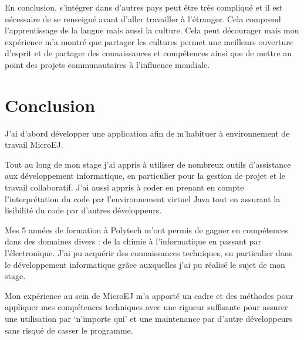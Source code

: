 \documentclass[french,a4paper,12pt]{report}
\begin{document}
En conclusion, s’intégrer dans d'autres pays peut être très compliqué et il est nécessaire de se renseigné avant d'aller travailler à l'étranger. Cela comprend l'apprentissage de la langue mais aussi la culture. Cela peut décourager mais mon expérience m'a montré que partager les cultures permet une meilleurs ouverture d'esprit et de partager des connaissances et compétences ainsi que de mettre au point des projets communautaires à l'influence mondiale.

\chapter{Conclusion}



J'ai d'abord développer une application afin de m'habituer à environnement de travail MicroEJ.

Tout au long de mon stage j’ai appris à utiliser de nombreux outils d’assistance aux développement informatique, en particulier pour la gestion de projet et le travail collaboratif. J'ai aussi appris à coder en prenant en compte l’interprétation du code par l'environnement virtuel Java tout en assurant la lisibilité du code par d'autres développeurs.

Mes 5 années de formation à Polytech m’ont permis de gagner en compétences dans des domaines divers : de la chimie à l’informatique en passant par l’électronique. J’ai pu acquérir des connaissances techniques, en particulier dans le développement informatique grâce auxquelles j'ai pu réalisé le sujet de mon stage.

Mon expérience au sein de MicroEJ m’a apporté un cadre et des méthodes pour appliquer mes compétences techniques avec une rigueur suffisante pour assurer une utilisation par ‘n’importe qui’ et une maintenance par d’autre développeurs sans risqué de casser le programme.
\end{document}
